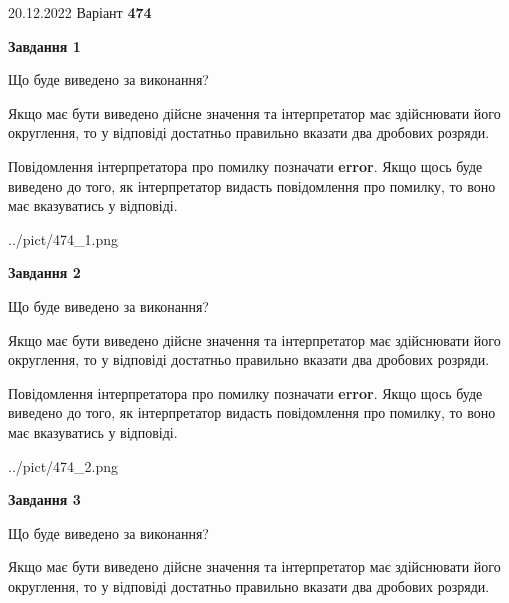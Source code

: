 \documentclass[12pt, ukrainian]{article}
\begin{document}
{20.12.2022 Варіант \No \textbf { 474 }\par}
{
\begin {Large}

{\begin {center}\textbf{Завдання 1}\end {center}}\par
Що буде виведено за виконання? \par

Якщо має бути виведено дійсне значення та інтерпретатор має здійснювати його округлення, 
то у відповіді достатньо правильно вказати два дробових розряди.

Повідомлення інтерпретатора про помилку позначати \textbf{error}.
Якщо щось буде виведено до того, як інтерпретатор видасть повідомлення про помилку, 
то воно має вказуватись у відповіді. \par

\begin{center}
	{../pict/474_1.png}
\end{center}
\newpage

{\begin {center}\textbf{Завдання 2}\end {center}}\par
Що буде виведено за виконання? \par

Якщо має бути виведено дійсне значення та інтерпретатор має здійснювати його округлення, 
то у відповіді достатньо правильно вказати два дробових розряди.

Повідомлення інтерпретатора про помилку позначати \textbf{error}.
Якщо щось буде виведено до того, як інтерпретатор видасть повідомлення про помилку, 
то воно має вказуватись у відповіді. \par

\begin{center}
	{../pict/474_2.png}
\end{center}
\newpage

{\begin {center}\textbf{Завдання 3}\end {center}}\par
Що буде виведено за виконання? \par

Якщо має бути виведено дійсне значення та інтерпретатор має здійснювати його округлення, 
то у відповіді достатньо правильно вказати два дробових розряди.


\end{Large}}
\end{document}
